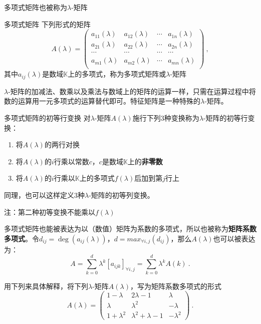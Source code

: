 多项式矩阵也被称为$\lambda$-矩阵

\begin{definition}{多项式矩阵}
下列形式的矩阵
$$A(\lambda)=\begin{pmatrix}
a_{11}(\lambda) & a_{12}(\lambda) & \cdots & a_{1n}(\lambda) \\
a_{21}(\lambda) & a_{22}(\lambda) & \cdots & a_{2n}(\lambda) \\
\cdots          & \cdots          & \cdots & \cdots          \\
a_{m1}(\lambda) & a_{m2}(\lambda) & \cdots & a_{mn}(\lambda) \\
\end{pmatrix}~,$$
其中$a_{ij}(\lambda)$是数域$\mathbb{K}$上的多项式，称为多项式矩阵或$\lambda$-矩阵
\end{definition}


$\lambda$-矩阵的加减法、数乘以及乘法与数域上的矩阵的运算一样，只需在运算过程中将数的运算用一元多项式的运算替代即可。特征矩阵是一种特殊的$\lambda$-矩阵。

\begin{definition}{多项式矩阵的初等行变换}
对$\lambda$-矩阵$A(\lambda)$施行下列3种变换称为$\lambda$-矩阵的初等行变换：
\begin{enumerate}
\item 将$A(\lambda)$的两行对换
\item 将$A(\lambda)$的$i$行乘以常数$c$，$c$是数域$\mathbb{K}$上的\textbf{非零数}
\item 将$A(\lambda)$的$i$行乘以$\mathbb{K}$上的多项式$f(\lambda)$后加到第$j$行上
\end{enumerate}
同理，也可以这样定义3种$\lambda$-矩阵的初等列变换。
\end{definition}

注：第二种初等变换不能乘以$f(\lambda)$

多项式矩阵也能被表达为以（数值）矩阵为系数的多项式，所以也被称为\textbf{矩阵系数多项式}。令$d_{ij}=\deg(a_{ij}(\lambda))$，$d=max_{\forall{i,j}}(d_{ij})$，那么$A(\lambda)$也可以被表达为：
\begin{equation}
A=\sum_{k=0}^d\lambda^k[a_{ijk}]_{\forall{i,j}}=\sum_{k=0}^d\lambda^kA(k)~.
\end{equation}

用下列来具体解释，将下列$\lambda$-矩阵$A(\lambda)$，写为矩阵系数多项式的形式
\begin{equation}
A(\lambda)=
\begin{pmatrix}
1-\lambda   & 2\lambda-1 & \lambda \\
\lambda     & \lambda^2  & -\lambda\\
1+\lambda^2 & \lambda^2+\lambda-1 & -\lambda^2
\end{pmatrix}~.
\end{equation}

